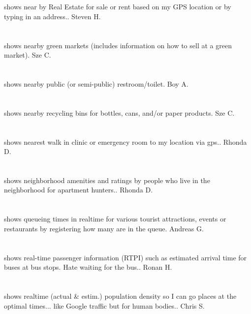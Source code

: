 \section{} shows near by Real Estate for sale or rent based on my GPS location or by typing in an address.. Steven H.
\section{}shows nearby green markets (includes information on how to sell at a green market). Sze C.
\section{}shows nearby public (or semi-public) restroom/toilet. Boy A.
\section{}shows nearby recycling bins for bottles,  cans,  and/or paper products. Sze C.
\section{}  shows nearest walk in clinic or emergency room to my location via gps.. Rhonda D.
\section{}shows neighborhood amenities and ratings by people who live in the neighborhood for apartment hunters.. Rhonda D.
\section{} shows queueing times in realtime for various tourist attractions,  events or restaurants by registering how many are in the queue. Andreas G.
\section{}shows real-time passenger information (RTPI) such as estimated arrival time for buses at bus stops.  Hate waiting for the bus.. Ronan H.
\section{}shows realtime (actual \& estim.) population density so I can go places at the optimal times... like Google traffic but for human bodies.. Chris S.
